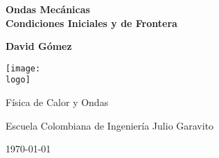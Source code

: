 \documentclass{article}
\newcommand{\logo}{"C:/Users/usuario/OneDrive/Documentos/U/logo-eci.png"}
\newcommand{\titlename}{Ondas Mecánicas\\[10pt] Condiciones Iniciales y de Frontera}%
\renewcommand{\author}{{David Gómez}}
\begin{document}
\begin{titlepage}
    \begin{center}
        \vspace{1cm}

        \textbf{\Huge{\titlename}}

        \vspace{1.5cm}

        \textbf{\large{\author}}

        \vspace{3cm}

        \texttt{[image: \\logo]}
        
        \vfill

        Física de Calor y Ondas

        Escuela Colombiana de Ingeniería Julio Garavito

        \today
    \end{center}
\end{titlepage}

\clearpage
\tableofcontents




\end{document}
